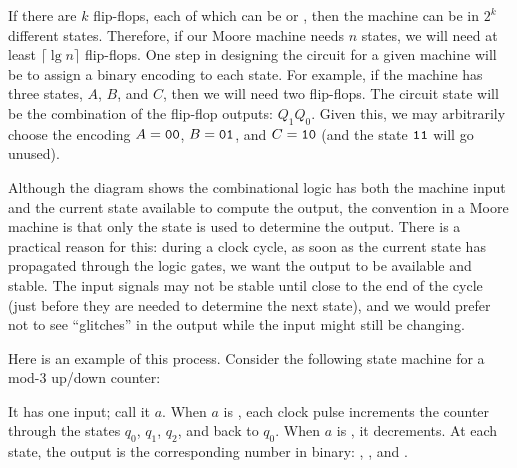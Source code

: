 If there are $k$ flip-flops, each of which can be \0 or \1, then the machine can be in $2^k$ different states. Therefore, if our Moore machine needs $n$ states, we will need at least $\lceil\lg n\rceil$ flip-flops. One step in designing the circuit for a given machine will be to assign a binary encoding to each state. For example, if the machine has three states, $A$, $B$, and $C$, then we will need two flip-flops. The circuit state will be the combination of the flip-flop outputs: $Q_1Q_0$. Given this, we may arbitrarily choose the encoding $A=\mathtt{0}\mathtt{0}$, $B=\mathtt{0}\mathtt{1}$, and $C=\mathtt{1}\mathtt{0}$ (and the state $\mathtt{1}\mathtt{1}$ will go unused).

Although the diagram shows the combinational logic has both the machine input and the current state available to compute the output, the convention in a Moore machine is that only the state is used to determine the output. There is a practical reason for this: during a clock cycle, as soon as the current state has propagated through the logic gates, we want the output to be available and stable. The input signals may not be stable until close to the end of the cycle (just before they are needed to determine the next state), and we would prefer not to see ``glitches'' in the output while the input might still be changing.

Here is an example of this process. Consider the following state machine for a mod-3 up/down counter:
\begin{center}
\end{center}
It has one input; call it $a$. When $a$ is \0, each clock pulse increments the counter through the states $q_0$, $q_1$, $q_2$, and back to $q_0$. When $a$ is \1, it decrements. At each state, the output is the corresponding number in binary: \0\0, \0\1, and \1\0.


